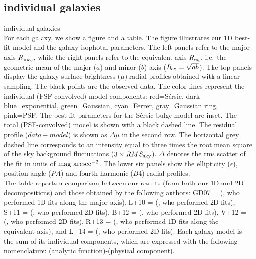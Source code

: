 \documentclass[preprint2]{emulateapj}
\begin{document}




  \onecolumngrid
  \subsection{individual galaxies}
  \label{sec:indgal}

  individual galaxies \\
  For each galaxy, we show a figure and a table. 
  The figure illustrates our 1D best-fit model and the galaxy isophotal parameters. 
  The left panels refer to the major-axis $R_{\rm maj}$, 
  while the right panels refer to the equivalent-axis $R_{\rm eq}$, 
  i.e.~the geometric mean of the major ($a$) and minor ($b$) axis ($R_{\rm eq} = \sqrt{ab}$).
  The top panels display the galaxy surface brightness ($\mu$) radial profiles obtained with a linear sampling. 
  The black points are the observed data.  
  The color lines represent the individual (PSF-convolved) model components:
  red=S\'ersic, dark blue=exponential, green=Gaussian, cyan=Ferrer, gray=Gaussian ring, pink=PSF. 
  The best-fit parameters for the S\'ersic bulge model are inset.
  The total (PSF-convolved) model is shown with a black dashed line. 
  The residual profile ($data - model$) is shown as $\Delta \mu$ in the second row.
  The horizontal grey dashed line corresponds to an intensity 
  equal to three times the root mean square of the sky background fluctuations ($3 \times RMS_{\rm sky}$).
  $\Delta$ denotes the rms scatter of the fit in units of $\rm mag~arcsec^{-2}$.
  The lower six panels show the ellipticity ($\epsilon$), position angle ($PA$) and fourth harmonic ($B4$) radial profiles. \\
  The table reports a comparison between our results (from both our 1D and 2D decompositions) and those obtained by the following authors: 
  GD07 = \citeauthor{grahamdriver2007} (\citeyear{grahamdriver2007}, who performed 1D fits along the major-axis), 
  L+10 = \citeauthor{laurikainen2010} (\citeyear{laurikainen2010}, who performed 2D fits), 
  S+11 = \citeauthor{sani2011} (\citeyear{sani2011}, who performed 2D fits), 
  B+12 = \citeauthor{beifiori2012} (\citeyear{beifiori2012}, who performed 2D fits), 
  V+12 = \citeauthor{vika2012} (\citeyear{vika2012}, who performed 2D fits), 
  R+13 = \citeauthor{rusli2013} (\citeyear{rusli2013}, who performed 1D fits along the equivalent-axis),
  and L+14 = \citeauthor{lasker2014data} (\citeyear{lasker2014data}, who performed 2D fits).
  Each galaxy model is the sum of its individual components, which are expressed with the following nomenclature: (analytic function)-(physical component).
\end{document}
